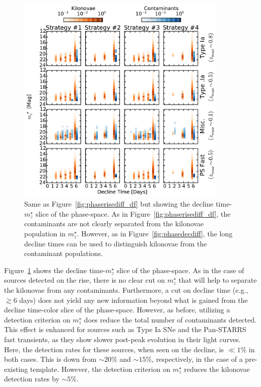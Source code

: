 \begin{figure}[t!]
\centering
\includegraphics[width=0.9\textwidth]{./figs/chapter2/ch2_f17.pdf}
\caption{Same as Figure~\ref{fig:phaserisediff_df} but showing the decline time-$m^{\star}_z$ slice of the phase-space. As in Figure~\ref{fig:phaserisediff_df}, the contaminants are not clearly separated from the kilonovae population in $m^{\star}_z$. However, as in Figure~\ref{fig:phasedecdiff}, the long decline times can be used to distinguish kilonovae from the contaminant populations.}
\label{fig:phasedecdiff_df}
\end{figure}
   
Figure~\ref{fig:phasedecdiff_df} shows the decline time-$m^{\star}_z$ slice of the phase-space. As in the case of sources detected on the rise, there is no clear cut on $m^{\star}_z$ that will help to separate the kilonovae from any contaminants. Furthermore, a cut on decline time (e.g., $\gtrsim 6$ days) does not yield any new information beyond what is gained from the decline time-color slice of the phase-space. However, as before, utilizing a detection criterion on $m^{\star}_z$ does reduce the total number of contaminants detected. This effect is enhanced for sources such as Type Ia SNe and the Pan-STARRS fast transients, as they show slower post-peak evolution in their light curves. Here, the detection rates for these sources, when seen on the decline, is $\ll1\%$ in both cases. This is down from $\sim20\%$ and $\sim15\%$, respectively, in the case of a pre-existing template. However, the detection criterion on $m^{\star}_z$ reduces the kilonovae detection rates by $\sim5\%$. 

